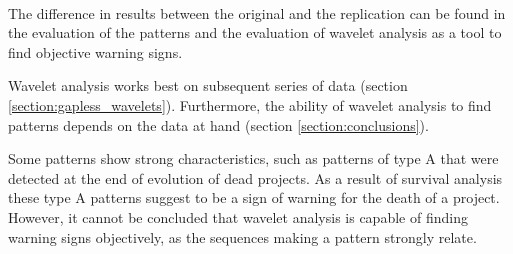 \paragraph{}
The difference in results between the original and the replication can be found
in the evaluation of the patterns and the evaluation of wavelet analysis as a
tool to find objective warning signs.

Wavelet analysis works best on subsequent series of data (section
\ref{section:gapless_wavelets}). Furthermore, the ability of wavelet analysis
to find patterns depends on the data at hand (section \ref{section:conclusions}).

Some patterns show strong characteristics, such as patterns of type A that were
detected at the end of evolution of dead projects. As a result of survival
analysis these type A patterns suggest to be a sign of warning for the death
of a project. However, it cannot be concluded that wavelet analysis is capable
of finding warning signs objectively, as the sequences making a pattern
strongly relate.

\begin{comment}
About original study:
- research questions
- participants
- design
- artifacts
- context variables
- summary of results

About replication:
- motivation
- level of interaction with original researchers
- changes to the original experiment

Comparison of results:
- consistent results
- differences in results

Conclude across studies.

\end{comment}